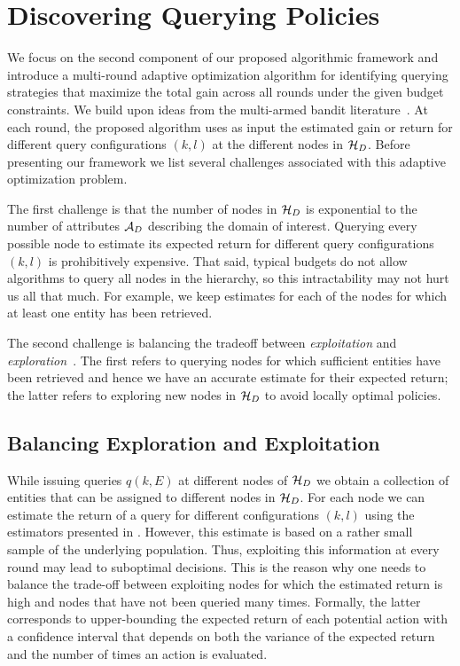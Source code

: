 

\section{Discovering Querying Policies}
\label{sec:solving}
We focus on the second component of our proposed algorithmic framework and introduce a multi-round adaptive optimization algorithm for identifying querying strategies that maximize the total gain across all rounds under the given budget constraints. We build upon ideas from the multi-armed bandit literature~\cite{Auer:2003,EvenDar06actionelimination}. At each round, the proposed algorithm uses as input the estimated gain or return for different query configurations $(k,l)$ at the different nodes in $\mathcal{H}_D$. Before presenting our framework we list several challenges associated with this adaptive optimization problem.

\squishlist
\item The first challenge is that the number of nodes in $\mathcal{H}_D$ is exponential to the number of attributes $\mathcal{A}_D$ describing the domain of interest. Querying every possible node to estimate its expected return for different query configurations $(k,l)$ is prohibitively expensive. That said, typical budgets do not allow algorithms to query all nodes in the hierarchy, so this intractability may not hurt us all that much. For example, we keep estimates for each of the nodes for which at least one entity has been retrieved.
\item The second challenge is balancing the tradeoff between {\em exploitation} and {\em exploration}~\cite{Auer:2003}. The first refers to querying nodes for which sufficient entities have been retrieved and hence we have an accurate estimate for their expected return; the latter refers to exploring new nodes in $\mathcal{H}_D$ to avoid locally optimal policies.
\squishend

\subsection{Balancing Exploration and Exploitation}
\label{sec:balancing}
While issuing queries $q(k,E)$ at different nodes of $\mathcal{H}_D$ we obtain a collection of entities that can be assigned to different nodes in $\mathcal{H}_D$. For each node we can estimate the return of a query for different configurations $(k,l)$ using the estimators presented in . However, this estimate is based on a rather small sample of the underlying population. Thus, exploiting this information at every round may lead to suboptimal decisions. This is the reason why one needs to balance the trade-off between exploiting nodes for which the estimated return is high and nodes that have not been queried many times. Formally, the latter corresponds to upper-bounding the expected return of each potential action with a confidence interval that depends on both the variance of the expected return and the number of times an action is evaluated.

